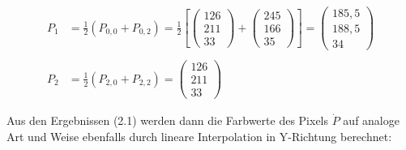 \documentclass[
fontsize=10pt, 
listof = totoc,
parskip = half	
]{report}
\begin{document}
\begin{equation}
	\begin{split}
		P_1	&=	\frac{1}{2} \left(P_{0,0} + P_{0,2}\right) =
				\frac{1}{2}
				\left[
				\begin{pmatrix}
					126\\
					211\\
					33
				\end{pmatrix}
				+
				\begin{pmatrix}
					245\\
					166\\
					35
				\end{pmatrix}
				\right]
				=
				\begin{pmatrix}
					185,5\\
					188,5\\
					34
				\end{pmatrix} \\\\
		P_2	&=	\frac{1}{2} \left(P_{2,0} + P_{2,2}\right) =
				\begin{pmatrix}
					126\\
					211\\
					33
				\end{pmatrix}
	\end{split}
\end{equation}

\noindent Aus den Ergebnissen (2.1) werden dann die Farbwerte des Pixels $\dot{P}$ auf analoge Art und Weise ebenfalls durch lineare Interpolation in Y-Richtung berechnet:
\end{document}
